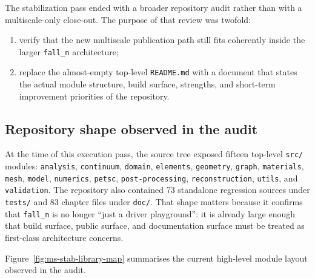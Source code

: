 The stabilization pass ended with a broader repository audit rather than with a
multiscale-only close-out.  The purpose of that review was twofold:
\begin{enumerate}
  \item verify that the new multiscale publication path still fits coherently
    inside the larger \texttt{fall\_n} architecture;
  \item replace the almost-empty top-level \texttt{README.md} with a document
    that states the actual module structure, build surface, strengths, and
    short-term improvement priorities of the repository.
\end{enumerate}

\subsection{Repository shape observed in the audit}

At the time of this execution pass, the source tree exposed fifteen top-level
\texttt{src/} modules:
\texttt{analysis}, \texttt{continuum}, \texttt{domain}, \texttt{elements},
\texttt{geometry}, \texttt{graph}, \texttt{materials}, \texttt{mesh},
\texttt{model}, \texttt{numerics}, \texttt{petsc},
\texttt{post-processing}, \texttt{reconstruction}, \texttt{utils}, and
\texttt{validation}.  The repository also contained 73 standalone regression
sources under \texttt{tests/} and 83 chapter files under \texttt{doc/}.  That
shape matters because it confirms that \texttt{fall\_n} is no longer ``just a
driver playground'': it is already large enough that build surface, public
surface, and documentation surface must be treated as first-class architecture
concerns.

Figure~\ref{fig:ms-stab-library-map} summarises the current high-level module
layout observed in the audit.

